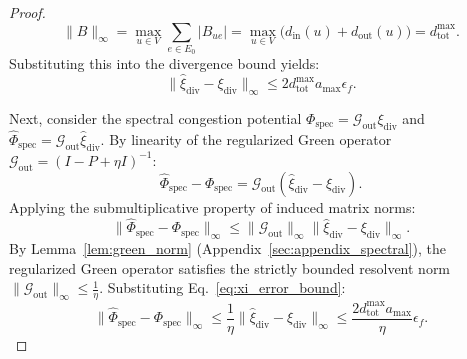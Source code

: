 \documentclass[11pt,a4paper]{article}
\begin{document}
\begin{proof}
\begin{equation}
\|B\|_\infty = \max_{u \in V} \sum_{e \in E_0} |B_{ue}| = \max_{u \in V} \big( d_{\text{in}}(u) + d_{\text{out}}(u) \big) = d_{\text{tot}}^{\max}.
\end{equation}
Substituting this into the divergence bound yields:
\begin{equation}
\label{eq:xi_error_bound}
\|\hat{\xi}_{\text{div}} - \xi_{\text{div}}\|_\infty \le 2 d_{\text{tot}}^{\max} a_{\max} \epsilon_f.
\end{equation}

Next, consider the spectral congestion potential $\Phi_{\text{spec}} = \mathcal{G}_{\text{out}} \xi_{\text{div}}$ and $\hat{\Phi}_{\text{spec}} = \mathcal{G}_{\text{out}} \hat{\xi}_{\text{div}}$. By linearity of the regularized Green operator $\mathcal{G}_{\text{out}} = (I - P + \eta I)^{-1}$:
\begin{equation}
\hat{\Phi}_{\text{spec}} - \Phi_{\text{spec}} = \mathcal{G}_{\text{out}} (\hat{\xi}_{\text{div}} - \xi_{\text{div}}).
\end{equation}
Applying the submultiplicative property of induced matrix norms:
\begin{equation}
\|\hat{\Phi}_{\text{spec}} - \Phi_{\text{spec}}\|_\infty \le \|\mathcal{G}_{\text{out}}\|_\infty \|\hat{\xi}_{\text{div}} - \xi_{\text{div}}\|_\infty.
\end{equation}
By Lemma~\ref{lem:green_norm} (Appendix~\ref{sec:appendix_spectral}), the regularized Green operator satisfies the strictly bounded resolvent norm $\|\mathcal{G}_{\text{out}}\|_\infty \le \frac{1}{\eta}$. Substituting Eq.~\eqref{eq:xi_error_bound}:
\begin{equation}
\label{eq:phi_spec_error_bound}
\|\hat{\Phi}_{\text{spec}} - \Phi_{\text{spec}}\|_\infty \le \frac{1}{\eta} \|\hat{\xi}_{\text{div}} - \xi_{\text{div}}\|_\infty \le \frac{2 d_{\text{tot}}^{\max} a_{\max}}{\eta} \epsilon_f.
\end{equation}


\end{proof}
\end{document}
